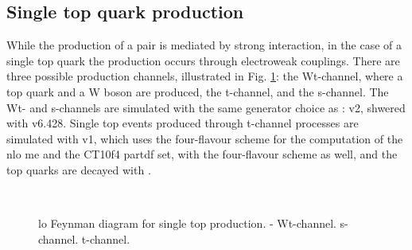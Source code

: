 \subsection{Single top quark production}

While the production of a \ttbar pair is mediated by strong interaction, in the case of a single top quark the production occurs through electroweak 
couplings. There are three possible production channels, illustrated in Fig. \ref{fig:single_top_prod}: the Wt-channel, where a top quark and a W boson are produced, the t-channel, and the s-channel. 
The Wt- and s-channels are simulated with the same generator choice as \ttbar: \PowhegBox v2, shwered with \PY v6.428.
Single top events produced through t-channel processes are simulated with \PowhegBox v1, which uses the four-flavour scheme for the computation of the \gls{nlo} \gls{me} and the CT10f4 \gls{partdf} set, with the four-flavour scheme as well, and the top quarks are decayed with \MadSpin \cite{Artoisenet:2012st}.

\begin{figure}[h]
\centering 
{}
 \\
\caption{\Gls{lo} Feynman diagram for single top production. - Wt-channel. 
 s-channel.  t-channel.}\label{fig:single_top_prod}
\end{figure}

